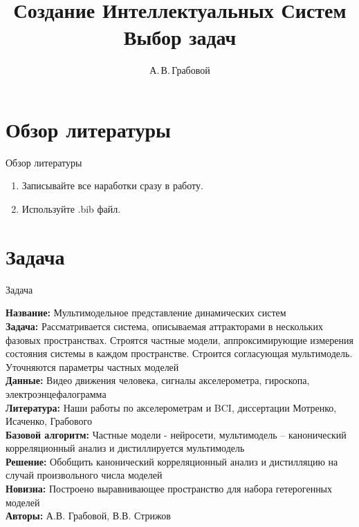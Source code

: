 \documentclass[10pt,pdf,hyperref={unicode}]{beamer}
\title[Вводная лекция]{Создание Интеллектуальных Систем \\ Выбор задач}
\author{А.\,В.\,Грабовой}
\institute[]{Московский физико-технический институт}
\begin{document}
\begin{frame}
\titlepage
\end{frame}

\section{Обзор литературы}
\begin{frame}{Обзор литературы}
\bigskip

\begin{enumerate}
    \item Записывайте все наработки сразу в работу.
    \item Используйте .bib файл.
\end{enumerate}

\end{frame}

\section{Задача}
\begin{frame}{Задача}
\bigskip

\textbf{Название:} Мультимодельное представление динамических систем \\
\textbf{Задача:} Рассматривается система, описываемая аттракторами в нескольких фазовых пространствах. Строятся частные модели, аппроксимирующие измерения состояния системы в каждом пространстве. Строится согласующая мультимодель. Уточняются параметры частных моделей \\
\textbf{Данные:} Видео движения человека, сигналы акселерометра, гироскопа, электроэнцефалограмма\\
\textbf{Литература:} Наши работы по акселерометрам и BCI, диссертации Мотренко, Исаченко, Грабового\\
\textbf{Базовой алгоритм:} Частные модели - нейросети, мультимодель – канонический корреляционный анализ и дистиллируется мультимодель\\
\textbf{Решение:} Обобщить канонический корреляционный анализ и дистилляцию на случай произвольного числа моделей\\
\textbf{Новизна:} Построено выравнивающее пространство для набора гетерогенных моделей\\
\textbf{Авторы:} А.В. Грабовой, В.В. Стрижов
\end{frame}
\end{document}
